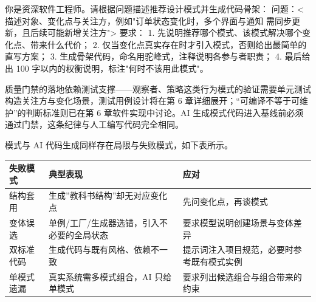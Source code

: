 \documentclass[12pt,a4paper,twoside,openany]{ctexbook}
\numberwithin{figure}{chapter}
\numberwithin{table}{chapter}
\newenvironment{Shaded}{}{}
\newcommand{\NormalTok}[1]{#1}
\newcounter{none}
\begin{document}
\begin{Shaded}
\begin{Highlighting}[]
\NormalTok{你是资深软件工程师。请根据问题描述推荐设计模式并生成代码骨架：}
\NormalTok{问题：\textless{}描述对象、变化点与关注方，例如"订单状态变化时，多个界面与通知}
\NormalTok{需同步更新，且后续可能新增关注方"\textgreater{}}
\NormalTok{要求：}
\NormalTok{1. 先说明推荐哪个模式、该模式解决哪个变化点、带来什么代价；}
\NormalTok{2. 仅当变化点真实存在时才引入模式，否则给出最简单的直写方案；}
\NormalTok{3. 生成骨架代码，命名用驼峰式，注释说明各参与者职责；}
\NormalTok{4. 最后给出 100 字以内的权衡说明，标注"何时不该用此模式"。}
\end{Highlighting}
\end{Shaded}

质量门禁的落地依赖测试支撑------观察者、策略这类行为模式的验证需要单元测试构造关注方与变化场景，测试用例设计将在第
6 章详细展开；``可编译不等于可维护''的判断标准则已在第 6
章软件实现中讨论。AI
生成模式代码进入基线前必须通过门禁，这条纪律与人工编写代码完全相同。

模式与 AI 代码生成同样存在局限与失败模式，如下表所示。

{\def\LTcaptype{none} %
\begin{longtable}[]{@{}
  >{\raggedright\arraybackslash}p{}
  >{\raggedright\arraybackslash}p{}
  >{\raggedright\arraybackslash}p{}@{}}
\toprule\noalign{}
\begin{minipage}[b]{\linewidth}\raggedright
失败模式
\end{minipage} & \begin{minipage}[b]{\linewidth}\raggedright
典型表现
\end{minipage} & \begin{minipage}[b]{\linewidth}\raggedright
应对
\end{minipage} \\
\midrule\noalign{}
\endhead
\bottomrule\noalign{}
\endlastfoot
结构套用 & 生成''教科书结构''却无对应变化点 & 先问变化点，再谈模式 \\
变体误选 & 单例/工厂/生成器选错，引入不必要的全局状态 &
要求模型说明创建场景与变体差异 \\
双标准代码 & 生成代码与既有风格、依赖不一致 &
提示词注入项目规范，必要时参考既有模式实例 \\
单模式遗漏 & 真实系统需多模式组合，AI 只给单模式 &
要求列出候选组合与组合带来的约束 \\
\end{longtable}
}
\end{document}
